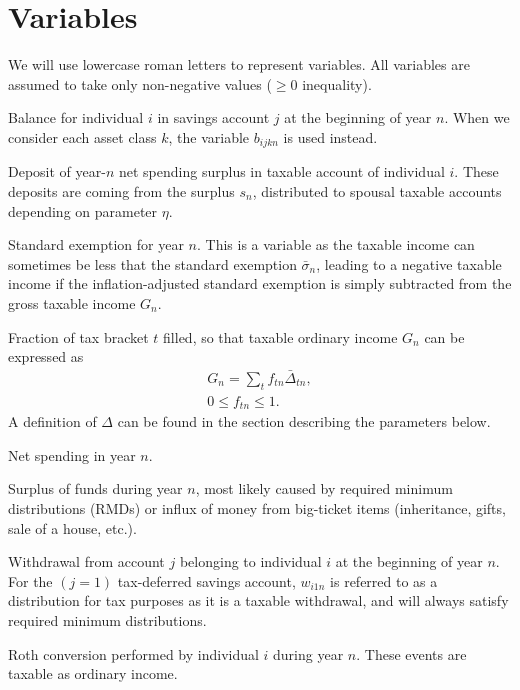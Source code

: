 \documentclass{report}[fleqn,12pt]
\begin{document}
\section{Variables}
We will use lowercase roman letters to represent variables. All variables are assumed
to take only non-negative values ($\ge 0$ inequality).
\begin{description}[leftmargin=4em,style=multiline]
\item [$b_{ijn}$]
	Balance for individual $i$ in savings account $j$ at the beginning of year $n$.
	When we consider each asset class $k$, the variable $b_{ijkn}$ is used instead.
\item [$d_{in}$]
	Deposit of year-$n$ net spending surplus in taxable account of individual $i$.
	These deposits are coming from the surplus $s_n$, distributed to
	spousal taxable accounts depending on parameter $\eta$.
\item [$e_{n}$]
	Standard exemption for year $n$. This is a variable as the taxable income can
        sometimes be less that the standard exemption $\bar{\sigma}_n$, leading to a
	negative taxable income if the inflation-adjusted standard exemption is simply subtracted
	from the gross taxable income $G_n$.
\item [$f_{t n}$]
	Fraction of tax bracket $t$ filled, so that taxable ordinary income $G_n$ can be expressed as
	\begin{eqnarray}
		\label{Eq:Tx1}
		G_n = \sum_t f_{t n}\bar{\Delta}_{t n},\\
		0 \leq f_{t n} \leq 1.
	\end{eqnarray}
	A definition of $\Delta$ can be found in the section describing the parameters below. 
\item [$g_n$]
	Net spending in year $n$.
\item [$s_{n}$]
	Surplus of funds during year $n$, most likely caused by required minimum distributions (RMDs)
	or influx of money from big-ticket items (inheritance, gifts, sale of a house, etc.).
\item [$w_{ijn}$]
	Withdrawal from account $j$ belonging to individual $i$ at the beginning of year $n$.
	For the $(j=1)$ tax-deferred savings account, $w_{i1n}$ is referred to as a distribution for
	tax purposes as it is a taxable withdrawal, and will always satisfy required minimum distributions.
\item [$x_{in}$]
	Roth conversion performed by individual $i$ during year $n$.
	These events are taxable as ordinary income.
\end{description}
\end{document}
